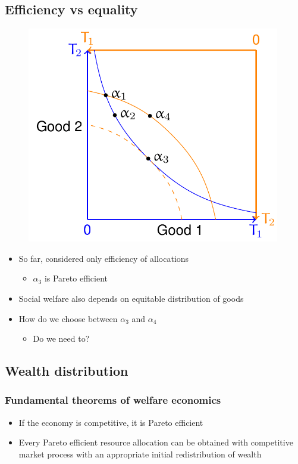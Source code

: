 \documentclass[class=report, crop=false, 12pt,a4paper]{standalone}
\begin{document}
\subsection{Efficiency vs equality}
\begin{figure}[H]
	\centering
	\includegraphics[width =0.5 \textwidth]{../img/figure11.png}
	\caption{}
\end{figure}
\begin{itemize}
	\item So far, considered only efficiency of allocations
	      \begin{itemize}
		      \item $\alpha_3$ is Pareto efficient
	      \end{itemize}
	\item Social welfare also depends on equitable distribution of goods
	\item How do we choose between $\alpha_3$ and $\alpha_4$
	      \begin{itemize}
		      \item Do we need to?
	      \end{itemize}
\end{itemize}
\subsection{Wealth distribution}
\subsubsection{Fundamental theorems of welfare economics}
\begin{itemize}
	\item If the economy is competitive, it is Pareto efficient
	\item Every Pareto efficient resource allocation can be obtained with competitive market process with an appropriate initial redistribution of wealth
\end{itemize}
\end{document}
